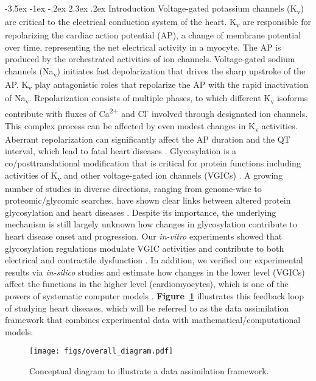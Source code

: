 \documentclass[11pt]{article}
\makeatletter
\renewcommand\section{\@startsection {section}{1}{\z@}%
                                   {-3.5ex \@plus -1ex \@minus -.2ex}%
                                   {2.3ex \@plus.2ex}%
                                   {\normalfont\fontfamily{phv}\fontsize{16}{19}\bfseries}}
\makeatother
\begin{document}
\section{Introduction}
Voltage-gated potassium channels (K\textsubscript{v}) are critical to the electrical conduction system of the heart. K\textsubscript{v} are responsible for repolarizing the cardiac action potential (AP), a change of membrane potential over time, representing the net electrical activity in a myocyte. The AP is produced by the orchestrated activities of ion channels. Voltage-gated sodium channels (Na\textsubscript{v}) initiates fast depolarization that drives the sharp upstroke of the AP. K\textsubscript{v} play antagonistic roles that repolarize the AP with the rapid inactivation of Na\textsubscript{v}. Repolarization consists of multiple phases, to which different K\textsubscript{v} isoforms contribute with fluxes of Ca\textsuperscript{2+} and Cl\textsuperscript{-} involved through designated ion channels. This complex process can be affected by even modest changes in K\textsubscript{v} activities. Aberrant repolarization can significantly affect the AP duration and the QT interval, which lead to fatal heart diseases \citep{ravens2008role}. Glycosylation is a co/posttranslational modification that is critical for protein functions including activities of K\textsubscript{v} and other voltage-gated ion channels (VGICs) \citep{ohtsubo2006glycosylation,ednie2012modulation}. A growing number of studies in diverse directions, ranging from genome-wise to proteomic/glycomic searches, have shown clear links between altered protein glycosylation and heart diseases \citep{yung2004gene,yang2015glycoproteins,miura2016glycomics,nagai2016aberrant}. Despite its importance, the underlying mechanism is still largely unknown how changes in glycosylation contribute to heart disease onset and progression. Our \textit{in-vitro} experiments showed that glycosylation regulations modulate VGIC activities and contribute to both electrical and contractile dysfunction \citep{ednie2013sialicNav1,ednie2015sialicKv,ednie2019reduced}. In addition, we verified our experimental results via \textit{in-silico} studies and estimate how changes in the lower level (VGICs) affect the functions in the higher level (cardiomyocytes), which is one of the powers of systematic computer models \citep{du2013silico,du2015statistical,du2017silico,kim2022simulation}. \textbf{Figure~\ref{fig:framework_diagram}} illustrates this feedback loop of studying heart diseases, which will be referred to as the data assimilation framework that combines experimental data with mathematical/computational models.
\begin{figure}[!ht]
    \centering
    \texttt{[image: figs/overall\_diagram.pdf]}
    \caption{Conceptual diagram to illustrate a data assimilation framework.}
    \label{fig:framework_diagram}
\end{figure}
\end{document}

